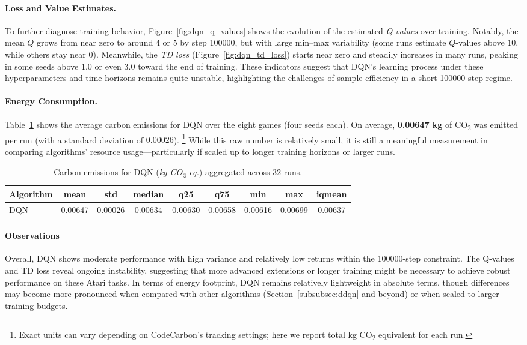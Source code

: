 \paragraph{Loss and Value Estimates.}
To further diagnose training behavior, Figure~\ref{fig:dqn_q_values} shows the evolution of the estimated \emph{Q-values} over training. Notably, the mean $Q$ grows from near zero to around $4$ or $5$ by step \num{100000}, but with large min--max variability (some runs estimate $Q$-values above $10$, while others stay near $0$). Meanwhile, the \emph{TD loss} (Figure~\ref{fig:dqn_td_loss}) starts near zero and steadily increases in many runs, peaking in some seeds above $1.0$ or even $3.0$ toward the end of training. These indicators suggest that DQN’s learning process under these hyperparameters and time horizons remains quite unstable, highlighting the challenges of sample efficiency in a short \num{100000}-step regime.

\paragraph{Energy Consumption.}
Table~\ref{tab:dqn-emissions} shows the average carbon emissions for DQN over the eight games (four seeds each). On average, \textbf{0.00647 kg} of CO\textsubscript{2} was emitted per run (with a standard deviation of $0.00026$).%
\footnote{Exact units can vary depending on CodeCarbon’s tracking settings; here we report total kg CO\textsubscript{2} equivalent for each run.}
While this raw number is relatively small, it is still a meaningful measurement in comparing algorithms’ resource usage—particularly if scaled up to longer training horizons or larger runs.

\begin{table}[htb]
	\centering
	\begin{tabular}{lcccccccc}
		\toprule
		\textbf{Algorithm} & \textbf{mean} & \textbf{std} & \textbf{median} & \textbf{q25} & \textbf{q75} & \textbf{min} & \textbf{max} & \textbf{iqmean}\\
		\midrule
		DQN & 0.00647 & 0.00026 & 0.00634 & 0.00630 & 0.00658 & 0.00616 & 0.00699 & 0.00637 \\
		\bottomrule
	\end{tabular}
	\caption{Carbon emissions for DQN (\emph{kg CO\textsubscript{2} eq.}) aggregated across 32 runs.}
	\label{tab:dqn-emissions}
\end{table}

\paragraph{Observations}
Overall, DQN shows moderate performance with high variance and relatively low returns within the \num{100000}-step constraint. The Q-values and TD loss reveal ongoing instability, suggesting that more advanced extensions or longer training might be necessary to achieve robust performance on these Atari tasks. In terms of energy footprint, DQN remains relatively lightweight in absolute terms, though differences may become more pronounced when compared with other algorithms (Section~\ref{subsubsec:ddqn} and beyond) or when scaled to larger training budgets.

